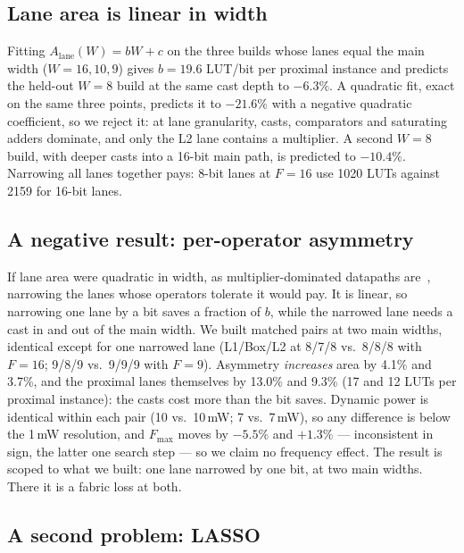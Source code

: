 \documentclass[conference]{IEEEtran}
\begin{document}
\subsection{Lane area is linear in width}
\label{sec:cost}

Fitting $A_{\text{lane}}(W)=bW+c$ on the three builds whose lanes equal the
main width ($W=16,10,9$) gives $b=19.6$ LUT/bit per proximal instance and
predicts the held-out $W=8$ build at the same cast depth to $-6.3\%$. A quadratic fit, exact on the same three points,
predicts it to $-21.6\%$ with a negative quadratic coefficient, so we reject it:
at lane granularity, casts, comparators and saturating adders dominate, and
only the L2 lane contains a multiplier. A second $W=8$ build, with deeper
casts into a 16-bit main path, is predicted to $-10.4\%$. Narrowing all lanes
together pays: 8-bit lanes at $F=16$ use 1020 LUTs against 2159 for 16-bit
lanes.

\subsection{A negative result: per-operator asymmetry}
\label{sec:asym}

If lane area were quadratic in width, as multiplier-dominated datapaths
are~\cite{constantinides2003wordlength}, narrowing the lanes whose operators
tolerate it would pay. It is linear, so narrowing one lane by a bit saves a
fraction of $b$, while the narrowed lane needs a cast in and out of the main
width. We built matched pairs at two main
widths, identical except for one narrowed lane (L1/Box/L2 at 8/7/8 vs.\ 8/8/8
with $F=16$; 9/8/9 vs.\ 9/9/9 with $F=9$). Asymmetry \emph{increases} area by
4.1\% and 3.7\%, and the proximal lanes themselves by 13.0\% and 9.3\% (17 and
12 LUTs per proximal instance): the casts cost more than the bit saves.
Dynamic power is identical within each pair (10 vs.\ 10\,mW; 7 vs.\ 7\,mW), so
any difference is below the 1\,mW resolution, and $F_{\max}$ moves by
$-5.5\%$ and $+1.3\%$ --- inconsistent in sign, the latter one search step ---
so we claim no frequency effect. The result is scoped to what we built:
one lane narrowed by one bit, at two main widths. There it is a fabric loss
at both.

\subsection{A second problem: LASSO}
\label{sec:lasso}
\end{document}
